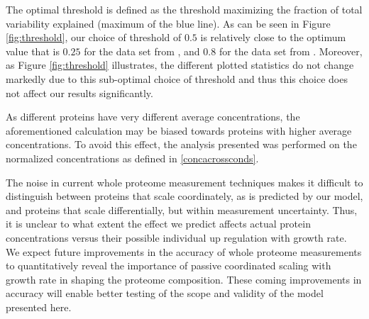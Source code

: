 \documentclass[a4paper]{article}
\begin{document}
The optimal threshold is defined as the threshold maximizing the fraction of total variability explained (maximum of the blue line).
As can be seen in Figure \ref{fig:threshold}, our choice of threshold of $0.5$ is relatively close to the optimum value that is $0.25$ for the data set from \cite{Heinemann2015}, and $0.8$ for the data set from \cite{Peebo_2015}.
Moreover, as Figure \ref{fig:threshold} illustrates, the different plotted statistics do not change markedly due to this sub-optimal choice of threshold and thus this choice does not affect our results significantly.

As different proteins have very different average concentrations, the aforementioned calculation may be biased towards proteins with higher average concentrations.
To avoid this effect, the analysis presented was performed on the normalized concentrations as defined in \ref{concacrossconds}.

The noise in current whole proteome measurement techniques makes it difficult to distinguish between proteins that scale coordinately, as is predicted by our model, and proteins that scale differentially, but within measurement uncertainty.
Thus, it is unclear to what extent the effect we predict affects actual protein concentrations versus their possible individual up regulation with growth rate.
We expect future improvements in the accuracy of whole proteome measurements to quantitatively reveal the importance of passive coordinated scaling with growth rate in shaping the proteome composition. These coming improvements in accuracy will enable better testing of the scope and validity of the model presented here.
\end{document}
